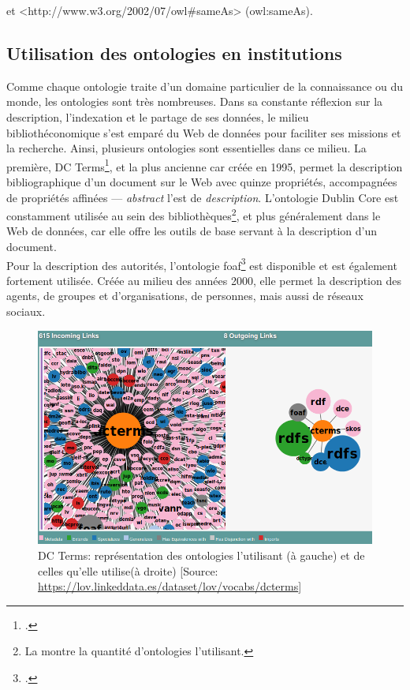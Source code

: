 \noindent et <http://www.w3.org/2002/07/owl\#sameAs> (owl:sameAs).

\subsection{\label{II-B-3-b}Utilisation des ontologies en institutions}

Comme chaque ontologie traite d'un domaine particulier de la connaissance ou du monde, les ontologies sont très nombreuses. Dans sa constante réflexion sur la description, l'indexation et le partage de ses données, le milieu bibliothéconomique s'est emparé du Web de données pour faciliter ses missions et la recherche. Ainsi, plusieurs ontologies sont essentielles dans ce milieu. La première, DC Terms\footcite{noauthor_dublin_nodate}, et la plus ancienne car créée en 1995, permet la description bibliographique d'un document sur le Web avec quinze propriétés, accompagnées de propriétés affinées --- \textit{abstract} l'est de \textit{description}. L'ontologie Dublin Core est constamment utilisée au sein des bibliothèques\footnote{La  montre la quantité d'ontologies l'utilisant.}, et plus généralement dans le Web de données, car elle offre les outils de base servant à la description d'un document.\\

Pour la description des autorités, l'ontologie \ac{foaf}\footcite{noauthor_foaf_nodate} est disponible et est également fortement utilisée. Créée au milieu des années 2000, elle permet la description des agents, de groupes et d'organisations, de personnes, mais aussi de réseaux sociaux.\\

\begin{figure}[!h]
	\centering
	\includegraphics[width=13cm]{images/onto_dcterms.png}
	\caption[L'ontologie DC Terms]{DC Terms: représentation des ontologies l'utilisant (à gauche) et de celles qu'elle utilise(à droite) [Source: \url{https://lov.linkeddata.es/dataset/lov/vocabs/dcterms}]}
	\label{onto_dcterms}
\end{figure}
\medskip

